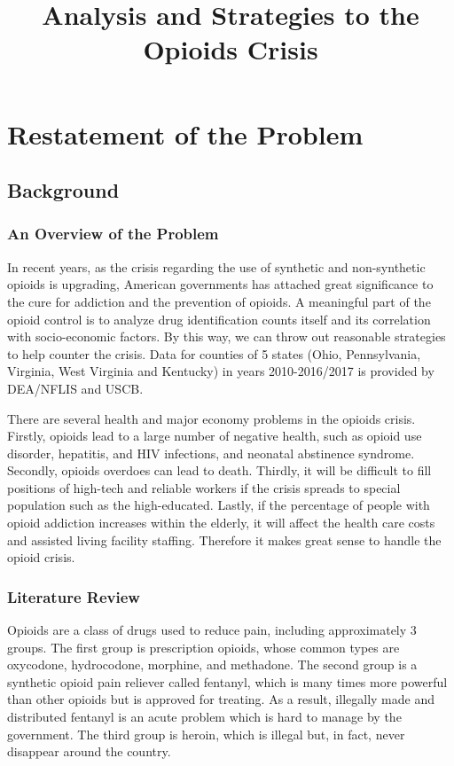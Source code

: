 \documentclass[12pt]{article}
\title{Analysis and Strategies to the Opioids Crisis }  %
\begin{document}


\section{Restatement of the Problem}
\subsection{Background}
\subsubsection{An Overview of the Problem}
In recent years, as the crisis regarding the use of synthetic and non-synthetic opioids is upgrading, American governments has attached great significance to the cure for addiction and the prevention of opioids. A meaningful part of the opioid control is to analyze drug identification counts itself and its correlation with socio-economic factors. By this way, we can throw out reasonable strategies to help counter the crisis. Data for counties of 5 states (Ohio, Pennsylvania, Virginia, West Virginia and Kentucky) in years 2010-2016/2017 is provided by DEA/NFLIS and USCB.

There are several health and major economy problems in the opioids crisis. Firstly, opioids lead to a large number of negative health, such as opioid use disorder, hepatitis, and HIV infections, and neonatal abstinence syndrome. Secondly, opioids overdoes can lead to death. Thirdly, it will be difficult to fill positions of high-tech and reliable workers if the crisis spreads to special population such as the high-educated. Lastly, if the percentage of people with opioid addiction increases within the elderly, it will affect the health care costs and assisted living facility staffing. Therefore it makes great sense to handle the opioid crisis.

\subsubsection{Literature Review}
Opioids are a class of drugs used to reduce pain, including approximately 3 groups\cite{CDC}. The first group is prescription opioids, whose common types are oxycodone, hydrocodone, morphine, and methadone. The second group is a synthetic opioid pain reliever called fentanyl, which is many times more powerful than other opioids but is approved for treating. As a result, illegally made and distributed fentanyl is an acute problem which is hard to manage by the government\cite{fentanyl}. The third group is heroin, which is illegal but, in fact, never disappear around the country\cite{heroin}.
\end{document}
